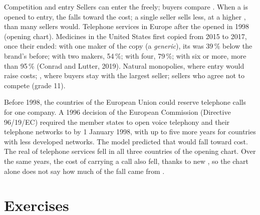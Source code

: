 \begin{model}{Competition and entry}
\assumes Sellers can enter the  freely; buyers compare .
\predicts When a  is opened to entry, the  falls toward the cost; a single seller sells less,
at a higher , than many sellers would.
\tested Telephone services in Europe after the  opened in 1998 (opening chart). Medicines in the
United States first copied from 2015 to 2017, once their  ended: with one maker of the copy
(a \emph{generic}), its  was 39\,\% below the brand's  before; with two makers, 54\,\%; with
four, 79\,\%; with six or more, more than 95\,\% (Conrad and Lutter, 2019).
\breaks Natural monopolies, where entry would raise costs; , where buyers stay with the
largest seller; sellers who agree not to compete (grade 11).
\end{model}

\begin{record}
Before 1998, the countries of the European Union could reserve telephone calls for one company. A 1996
decision of the European Commission (Directive 96/19/EC) required the member states to open voice
telephony and their telephone networks to  by 1 January 1998, with up to five more years
for countries with less developed networks. The model predicted that  would fall toward cost.
The real  of telephone services fell in all three countries of the opening chart. Over the same
years, the cost of carrying a call also fell, thanks to new , so the chart alone does not
say how much of the fall came from .
\end{record}

\section{Exercises}


